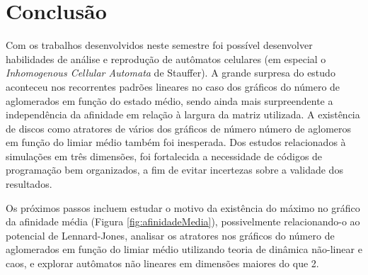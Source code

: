 \documentclass[
	12pt,				%
	openright,			%
	twoside,			%
	a4paper,			%
	english,			%
	french,				%
	spanish,			%
	brazil				%
	]{abntex2}
\begin{document}

\chapter{Conclusão}

Com os trabalhos desenvolvidos neste semestre foi possível desenvolver habilidades de análise e reprodução de autômatos celulares (em especial o \textit{Inhomogenous Cellular Automata} de Stauffer). A grande surpresa do estudo aconteceu nos recorrentes padrões lineares no caso dos gráficos do número de aglomerados em função do estado médio, sendo ainda mais surpreendente a independência da afinidade em relação à largura da matriz utilizada. A existência de discos como atratores de vários dos gráficos de número número de aglomeros em função do limiar médio também foi inesperada. Dos estudos relacionados à simulações em três dimensões, foi fortalecida a necessidade de códigos de programação bem organizados, a fim de evitar incertezas sobre a validade dos resultados.

Os próximos passos incluem estudar o motivo da existência do máximo no gráfico da afinidade média (Figura \ref{fig:afinidadeMedia}), possivelmente relacionando-o ao potencial de Lennard-Jones, analisar os atratores nos gráficos do número de aglomerados em função do limiar médio utilizando teoria de dinâmica não-linear e caos, e explorar autômatos não lineares em dimensões maiores do que 2.

\postextual



%
%

\end{document}
